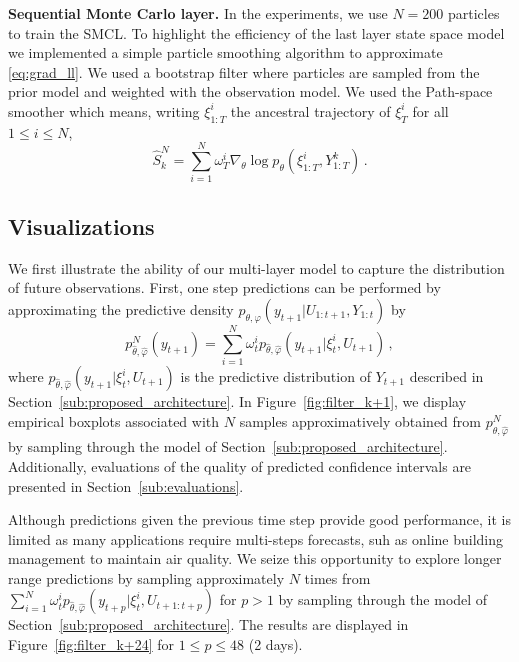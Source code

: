 \documentclass{article}
\begin{document}
	{\bf Sequential Monte Carlo layer.} In the experiments, we use $N=200$ particles to train the SMCL. To highlight the efficiency of the last layer state space model we implemented a simple particle smoothing algorithm to approximate \eqref{eq:grad_ll}. We used a bootstrap filter where particles are sampled from the prior model and weighted with the observation model. We used the Path-space smoother which means, writing $\xi_{1:T}^i$ the ancestral trajectory of $\xi_T^i$ for all $1\leq i \leq N$,
$$
	\widehat S_k^N = \sum_{i=1}^N \omega_T^i\nabla_\theta\log p_\theta(\xi^i_{1:T}, Y^{k}_{1:T})\,.
$$

\subsection{Visualizations}%
\label{sub:visualizations}
We first illustrate the ability of our multi-layer model to capture the distribution of future observations. First, one step predictions can be performed by approximating the predictive density $p_{\theta,\varphi}(y_{t+1}|U_{1:t+1},Y_{1:t})$ by
$$
	p^N_{\widehat\theta,\widehat\varphi}(y_{t+1})= \sum_{i=1}^{N}\omega_t^i p_{\widehat\theta,\widehat\varphi}(y_{t+1}|\xi_t^i,U_{t+1})\,,
$$
where $ p_{\widehat\theta,\widehat\varphi}(y_{t+1}|\xi_t^i,U_{t+1})$ is the predictive distribution of $Y_{t+1}$ described in Section~\ref{sub:proposed_architecture}. In Figure~\ref{fig:filter_k+1}, we display empirical boxplots associated with $N$ samples approximatively obtained from $p^N_{\widehat\theta,\widehat\varphi}$ by sampling through the model of Section~\ref{sub:proposed_architecture}.
Additionally, evaluations of the quality of predicted confidence intervals are presented in Section~\ref{sub:evaluations}.

Although predictions given the previous time step provide good performance, it is limited as many applications require multi-steps forecasts, suh as online building management to maintain air quality. We seize this opportunity to explore longer range predictions by sampling approximately $N$ times from $\sum_{i=1}^{N}\omega_t^i p_{\widehat\theta,\widehat\varphi}(y_{t+p}|\xi_t^i,U_{t+1:t+p})$ for $p>1$ by sampling through the model of Section~\ref{sub:proposed_architecture}.
The results are displayed in Figure~\ref{fig:filter_k+24} for $1\leq p \leq 48$ (2 days).
\end{document}
